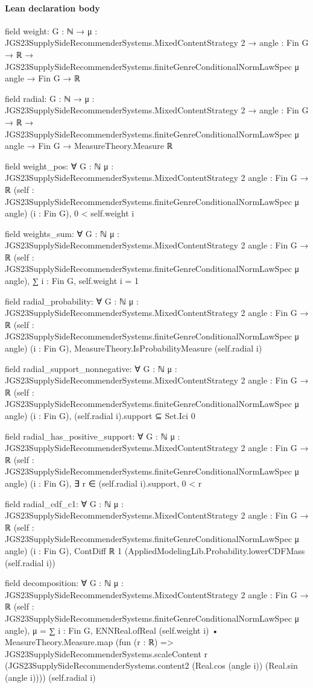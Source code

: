 \documentclass[10pt]{article}
\begin{document}
\paragraph{Lean declaration body}
\begin{ReviewVerbatim}
field weight:
{G : ℕ} →
  {μ : JGS23SupplySideRecommenderSystems.MixedContentStrategy 2} →
    {angle : Fin G → ℝ} → JGS23SupplySideRecommenderSystems.finiteGenreConditionalNormLawSpec μ angle → Fin G → ℝ

field radial:
{G : ℕ} →
  {μ : JGS23SupplySideRecommenderSystems.MixedContentStrategy 2} →
    {angle : Fin G → ℝ} →
      JGS23SupplySideRecommenderSystems.finiteGenreConditionalNormLawSpec μ angle → Fin G → MeasureTheory.Measure ℝ

field weight_pos:
∀ {G : ℕ} {μ : JGS23SupplySideRecommenderSystems.MixedContentStrategy 2} {angle : Fin G → ℝ}
  (self : JGS23SupplySideRecommenderSystems.finiteGenreConditionalNormLawSpec μ angle) (i : Fin G), 0 < self.weight i

field weights_sum:
∀ {G : ℕ} {μ : JGS23SupplySideRecommenderSystems.MixedContentStrategy 2} {angle : Fin G → ℝ}
  (self : JGS23SupplySideRecommenderSystems.finiteGenreConditionalNormLawSpec μ angle), ∑ i : Fin G, self.weight i = 1

field radial_probability:
∀ {G : ℕ} {μ : JGS23SupplySideRecommenderSystems.MixedContentStrategy 2} {angle : Fin G → ℝ}
  (self : JGS23SupplySideRecommenderSystems.finiteGenreConditionalNormLawSpec μ angle) (i : Fin G),
  MeasureTheory.IsProbabilityMeasure (self.radial i)

field radial_support_nonnegative:
∀ {G : ℕ} {μ : JGS23SupplySideRecommenderSystems.MixedContentStrategy 2} {angle : Fin G → ℝ}
  (self : JGS23SupplySideRecommenderSystems.finiteGenreConditionalNormLawSpec μ angle) (i : Fin G),
  (self.radial i).support ⊆ Set.Ici 0

field radial_has_positive_support:
∀ {G : ℕ} {μ : JGS23SupplySideRecommenderSystems.MixedContentStrategy 2} {angle : Fin G → ℝ}
  (self : JGS23SupplySideRecommenderSystems.finiteGenreConditionalNormLawSpec μ angle) (i : Fin G),
  ∃ r ∈ (self.radial i).support, 0 < r

field radial_cdf_c1:
∀ {G : ℕ} {μ : JGS23SupplySideRecommenderSystems.MixedContentStrategy 2} {angle : Fin G → ℝ}
  (self : JGS23SupplySideRecommenderSystems.finiteGenreConditionalNormLawSpec μ angle) (i : Fin G),
  ContDiff ℝ 1 (AppliedModelingLib.Probability.lowerCDFMass (self.radial i))

field decomposition:
∀ {G : ℕ} {μ : JGS23SupplySideRecommenderSystems.MixedContentStrategy 2} {angle : Fin G → ℝ}
  (self : JGS23SupplySideRecommenderSystems.finiteGenreConditionalNormLawSpec μ angle),
  μ =
    ∑ i : Fin G,
      ENNReal.ofReal (self.weight i) •
        MeasureTheory.Measure.map
          (fun (r : ℝ) =>
            JGS23SupplySideRecommenderSystems.scaleContent r
              (JGS23SupplySideRecommenderSystems.content2 (Real.cos (angle i)) (Real.sin (angle i))))
          (self.radial i)
\end{ReviewVerbatim}
\end{document}

